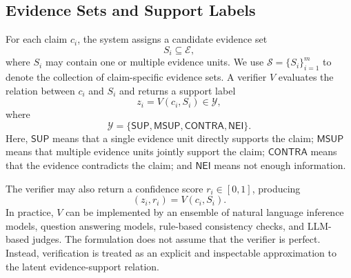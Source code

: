 \subsection{Evidence Sets and Support Labels}
\label{subsec:evidence_support}

For each claim $c_i$, the system assigns a candidate evidence set
\begin{equation}
    S_i \subseteq \mathcal{E},
\end{equation}
where $S_i$ may contain one or multiple evidence units. We use $\mathcal{S} = \{S_i\}_{i=1}^{m}$ to denote the collection of claim-specific evidence sets. A verifier $V$ evaluates the relation between $c_i$ and $S_i$ and returns a support label
\begin{equation}
    z_i = V(c_i, S_i) \in \mathcal{Y},
\end{equation}
where
\begin{equation}
    \mathcal{Y} = \{\mathsf{SUP}, \mathsf{MSUP}, \mathsf{CONTRA}, \mathsf{NEI}\}.
\end{equation}
Here, $\mathsf{SUP}$ means that a single evidence unit directly supports the claim; $\mathsf{MSUP}$ means that multiple evidence units jointly support the claim; $\mathsf{CONTRA}$ means that the evidence contradicts the claim; and $\mathsf{NEI}$ means not enough information.

The verifier may also return a confidence score $r_i \in [0,1]$, producing
\begin{equation}
    (z_i, r_i) = V(c_i, S_i).
\end{equation}
In practice, $V$ can be implemented by an ensemble of natural language inference models, question answering models, rule-based consistency checks, and LLM-based judges. The formulation does not assume that the verifier is perfect. Instead, verification is treated as an explicit and inspectable approximation to the latent evidence-support relation.

